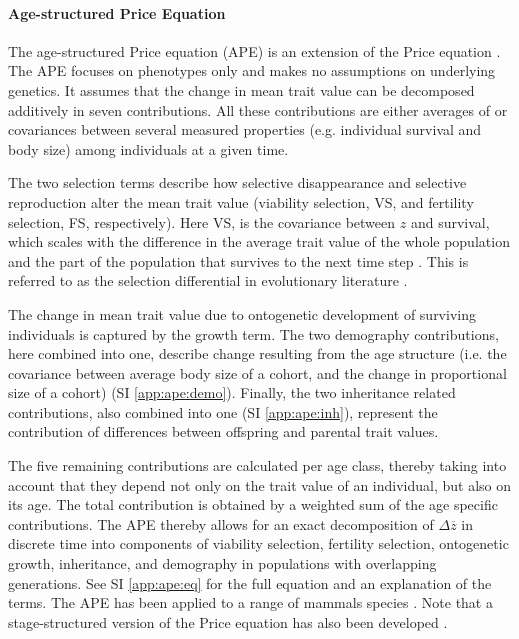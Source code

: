 \paragraph{Age-structured Price Equation}
The age-structured Price equation (APE) \parencite{Coulson2008} is an extension of the Price equation \parencite{Price1970}. The APE focuses on phenotypes only and makes no assumptions on underlying genetics. It assumes that the change in mean trait value can be decomposed additively in seven contributions. All these contributions are either averages of or covariances between several measured properties (e.g. individual survival and body size) among individuals at a given time. 

The two selection terms describe how selective disappearance and selective reproduction alter the mean trait value (viability selection, VS, and fertility selection, FS, respectively). Here VS, is the covariance between $z$ and survival, which scales with the difference in the average trait value of the whole population and the part of the population that survives to the next time step \parencite[e.g.][]{rebke2012}. This is referred to as the selection differential in evolutionary literature \parencite{Robertson1966,Lande1983}. 

The change in mean trait value due to ontogenetic development of surviving individuals is captured by the growth term. The two demography contributions, here combined into one, describe change resulting from the age structure (i.e. the covariance between average body size of a cohort, and the change in proportional size of a cohort) (SI \ref{app:ape:demo}). Finally, the two inheritance related contributions, also combined into one (SI \ref{app:ape:inh}), represent the contribution of differences between offspring and parental trait values.

The five remaining contributions are calculated per age class, thereby taking into account that they depend not only on the trait value of an individual, but also on its age. The total contribution is obtained by a weighted sum of the age specific contributions. The APE thereby allows for an exact decomposition of $\Delta \overline z$ in discrete time into components of viability selection, fertility selection, ontogenetic growth, inheritance, and demography in populations with overlapping generations. See SI \ref{app:ape:eq} for the full equation and an explanation of the terms. The APE has been applied to a range of mammals species \parencite{Coulson2008,Ozgul2009,Ozgul2010,Canale2016}. Note that a  stage-structured version of the Price equation has also been developed \parencite{Barfield2011}.

